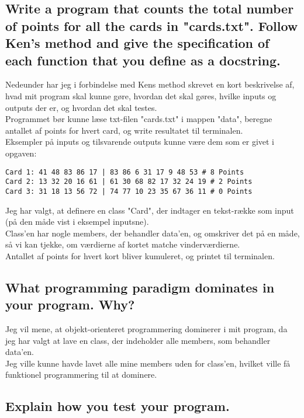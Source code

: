 \documentclass[a4paper,12pt]{article}
\begin{document}
\subsection[Write a program that counts the total number of points for all the cards]{Write a program that counts the total number of points for all the cards in "cards.txt".
Follow Ken's method and give the specification of each function that you define as a docstring.}

Nedeunder har jeg i forbindelse med Kens method skrevet en kort beskrivelse af, hvad mit program skal kunne gøre, hvordan det skal gøres, hvilke inputs og outputs der er, og hvordan det skal testes.\\

Programmet bør kunne læse txt-filen "cards.txt" i mappen "data", beregne antallet af points for hvert card, og write resultatet til terminalen.\\
Eksempler på inputs og tilsvarende outputs kunne være dem som er givet i opgaven:
\begin{lstlisting}
Card 1: 41 48 83 86 17 | 83 86 6 31 17 9 48 53 # 8 Points
Card 2: 13 32 20 16 61 | 61 30 68 82 17 32 24 19 # 2 Points
Card 3: 31 18 13 56 72 | 74 77 10 23 35 67 36 11 # 0 Points
\end{lstlisting} 
Jeg har valgt, at definere en class "Card", der indtager en tekst-række som input (på den måde vist i eksempel inputsne).\\
Class'en har nogle members, der behandler data'en, og omskriver det på en måde, så vi kan tjekke, om værdierne af kortet matche vinderværdierne.\\
Antallet af points for hvert kort bliver kumuleret, og printet til terminalen.

\subsection[What programming paradigm dominates in your program]{What programming paradigm dominates in your program. Why?}

Jeg vil mene, at objekt-orienteret programmering dominerer i mit program, da jeg har valgt at lave en class, der indeholder alle members, som behandler data'en.\\
Jeg ville kunne havde lavet alle mine members uden for class'en, hvilket ville få funktionel programmering til at dominere.

\subsection[Explain how you test your program]{Explain how you test your program.}
\end{document}
